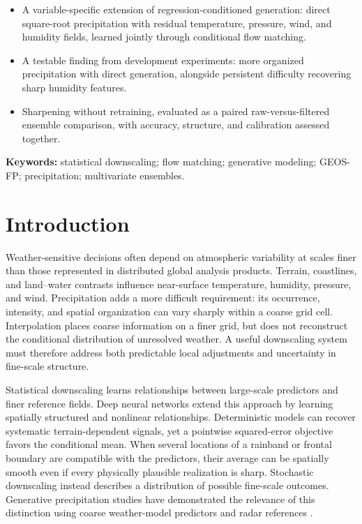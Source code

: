 \documentclass[10pt]{article}
\begin{document}
\vspace{0.8em}
\par
\begin{itemize}
\item A variable-specific extension of regression-conditioned generation: direct square-root precipitation with residual temperature, pressure, wind, and humidity fields, learned jointly through conditional flow matching.
\item A testable finding from development experiments: more organized precipitation with direct generation, alongside persistent difficulty recovering sharp humidity features.
\item Sharpening without retraining, evaluated as a paired raw-versus-filtered ensemble comparison, with accuracy, structure, and calibration assessed together.
\end{itemize}
\vspace{0.5em}
\noindent\textbf{Keywords:} statistical downscaling; flow matching; generative modeling; GEOS-FP; precipitation; multivariate ensembles.
\vfill
{}
\twocolumn\raggedbottom

\section{Introduction}\label{sec:intro}
Weather-sensitive decisions often depend on atmospheric variability at scales finer than those represented in distributed global analysis products. Terrain, coastlines, and land--water contrasts influence near-surface temperature, humidity, pressure, and wind. Precipitation adds a more difficult requirement: its occurrence, intensity, and spatial organization can vary sharply within a coarse grid cell. Interpolation places coarse information on a finer grid, but does not reconstruct the conditional distribution of unresolved weather. A useful downscaling system must therefore address both predictable local adjustments and uncertainty in fine-scale structure.

Statistical downscaling learns relationships between large-scale predictors and finer reference fields. Deep neural networks extend this approach by learning spatially structured and nonlinear relationships. Deterministic models can recover systematic terrain-dependent signals, yet a pointwise squared-error objective favors the conditional mean. When several locations of a rainband or frontal boundary are compatible with the predictors, their average can be spatially smooth even if every physically plausible realization is sharp. Stochastic downscaling instead describes a distribution of possible fine-scale outcomes. Generative precipitation studies have demonstrated the relevance of this distinction using coarse weather-model predictors and radar references \citep{harris2022}.
\end{document}
